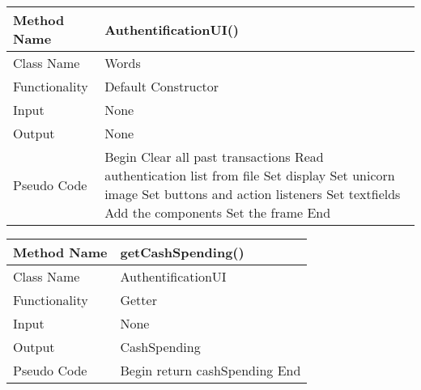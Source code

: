 \documentclass{article}
\newcommand\tab[1][1cm]{\hspace*{#1}}
\begin{document}


\begin{center}
\begin{tabular}{|p{2.5cm}||p{10cm}|}
\hline
Method Name & AuthentificationUI() \\
\hline
Class Name & Words \\
\hline
Functionality & Default Constructor\\
\hline

Input & None\\
\hline
Output & None\\
\hline

Pseudo Code & Begin\newline
\tab Clear all past transactions\newline
\tab Read authentication list from file\newline
\tab Set display\newline
\tab Set unicorn image\newline
\tab Set buttons and action listeners\newline
\tab Set textfields\newline
\tab Add the components\newline
\tab Set the frame\newline
End \\
\hline
\end{tabular}
\end{center}

\begin{center}
\begin{tabular}{|p{2.5cm}||p{10cm}|}
\hline
Method Name & getCashSpending() \\
\hline
Class Name & AuthentificationUI \\
\hline
Functionality & Getter\\
\hline

Input & None\\
\hline
Output & CashSpending\\
\hline

Pseudo Code & Begin\newline
\tab return cashSpending\newline
End \\
\hline
\end{tabular}
\end{center}
\end{document}
